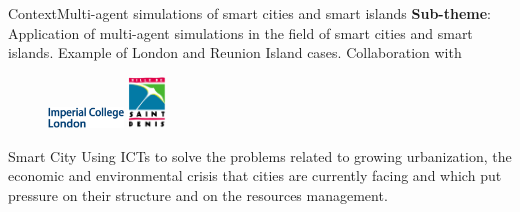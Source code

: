
\begin{frame}{Context}{Multi-agent simulations of smart cities and smart islands}
\textbf{Sub-theme}: Application of multi-agent \alert{simulations} in the field of smart cities and smart islands. Example of London and Reunion Island cases. Collaboration with 
    \begin{figure}
	\includegraphics[width=2cm]{assets/icl.png}
	\hspace{2cm}
	\includegraphics[width=1cm]{assets/saintDenis.png}
    \end{figure}

\begin{block}{Smart City}
Using ICTs to solve the problems related to growing urbanization, the economic and environmental crisis that cities are currently facing and which put pressure on their structure and on the \alert{resources management}. 


\end{block}
\end{frame}
